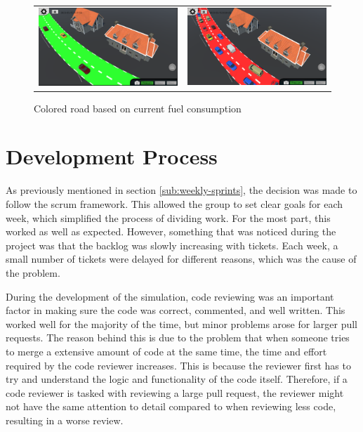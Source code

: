        
    \begin{figure}[H]
        \begin{tabular}{cc}
            \includegraphics[width=0.48\linewidth]{Project_report/figures/method/green road.png} & 
            \includegraphics[width=0.48\linewidth]{Project_report/figures/method/red road.png} \\
        \end{tabular}
        \caption{Colored road based on current fuel consumption}
        \label{fig:color-roads}
    \end{figure}
    
    
    
\section{Development Process}
    As previously mentioned in section \ref{sub:weekly-sprints}, the decision was made to follow the scrum framework. This allowed the group to set clear goals for each week, which simplified the process of dividing work. For the most part, this worked as well as expected. However, something that was noticed during the project was that the backlog was slowly increasing with tickets. Each week, a small number of tickets were delayed for different reasons, which was the cause of the problem. 

    During the development of the simulation, code reviewing was an important factor in making sure the code was correct, commented, and well written. This worked well for the majority of the time, but minor problems arose for larger pull requests. The reason behind this is due to the problem that when someone tries to merge a extensive amount of code at the same time, the time and effort required by the code reviewer increases. This is because the reviewer first has to try and understand the logic and functionality of the code itself. Therefore, if a code reviewer is tasked with reviewing a large pull request, the reviewer might not have the same attention to detail compared to when reviewing less code, resulting in a worse review. 


